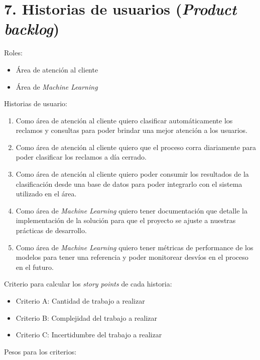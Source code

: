 \documentclass[
11pt, %
]{charter}
\begin{document}

\section{7. Historias de usuarios (\textit{Product backlog})}
\label{sec:backlog}

Roles:
\begin{itemize}
	\item Área de atención al cliente
	\item Área de \textit{Machine Learning}
\end{itemize}

Historias de usuario:

\begin{enumerate}
	\item Como área de atención al cliente quiero clasificar automáticamente los reclamos y consultas para poder brindar una mejor atención a los usuarios.
	\item Como área de atención al cliente quiero que el proceso corra diariamente para poder clasificar los reclamos a día cerrado.
	\item Como área de atención al cliente quiero poder consumir los resultados de la clasificación desde una base de datos para poder integrarlo con el sistema utilizado en el área.
	\item Como área de \textit{Machine Learning} quiero tener documentación que detalle la implementación de la solución para que el proyecto se ajuste a nuestras prácticas de desarrollo.
	\item Como área de \textit{Machine Learning} quiero tener métricas de performance de los modelos para tener una referencia y poder monitorear desvíos en el proceso en el futuro.
	
\end{enumerate}

Criterio para calcular los \textit{story points} de cada historia:

\begin{itemize}
	\item Criterio A: Cantidad de trabajo a realizar
	\item Criterio B: Complejidad del trabajo a realizar
	\item Criterio C: Incertidumbre del trabajo a realizar
\end{itemize}

Pesos para los criterios:
\end{document}

